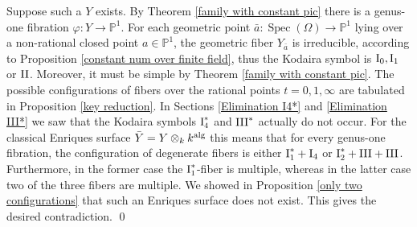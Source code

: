 \documentclass[oneside, 12pt]{amsart}
\theoremstyle{definition}
\theoremstyle{remark}
\newcommand{\PP}{\mathbb{P}}
\newcommand{\alg}{\text{\rm alg}}
\newcommand{\I}{\text{\rm I}}
\newcommand{\II}{\text{\rm II}}
\newcommand{\III}{\text{\rm III}}
\newcommand{\ra}{\rightarrow}
\newcommand{\Spec}{\operatorname{Spec}}
\newcommand{\bY}{{\bar{Y}}}
\newcommand{\ba}{{\bar{a}}}
\begin{document}
\proof
Suppose such a $Y$ exists.
By Theorem \ref{family with constant pic} there is a genus-one fibration $\varphi:Y\ra\PP^1$.
For each geometric point $\ba:\Spec(\Omega)\ra \PP^1$ lying over a non-rational closed point  $a\in\PP^1$, the geometric fiber $Y_\ba$
is  irreducible, according to Proposition \ref{constant num over finite field},  thus the  Kodaira symbol is $\I_0, \I_1$ or $\II$.
Moreover, it must be simple by Theorem \ref{family with constant pic}.
The possible configurations of fibers over the rational points $t=0,1,\infty$ are tabulated
in Proposition \ref{key reduction}.  
 In Sections \ref{Elimination I4*} and \ref{Elimination III*} we saw that the Kodaira symbols
$\I_4^*$ and $\III^*$ actually do not occur.
For the classical Enriques surface $\bY=Y\otimes_kk^\alg$   this means that for every genus-one fibration, the configuration
of degenerate fibers is either $\I_1^*+\I_4$ or $\I_2^*+\III+\III$. Furthermore, in the former case the $\I_1^*$-fiber is multiple,
whereas in the latter case two of the three fibers are multiple.
 We showed in Proposition \ref{only two configurations} that
such an  Enriques surface does not exist. This gives the desired contradiction.
\qed
 
\end{document}
